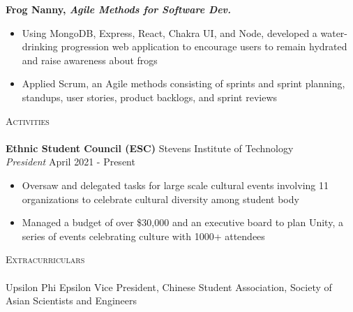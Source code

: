\documentclass[10pt]{article}
\newcommand{\lineunder} {
    \vspace*{-8pt} \\
    \hspace*{-18pt} \hrulefill \\
}
\newcommand{\header} [1] {
    {\hspace*{-18pt}\vspace*{6pt} \textsc{#1}}
    \vspace*{-6pt} \lineunder
}
\begin{document}
\textbf{Frog Nanny, \textit{Agile Methods for Software Dev.}} 
\begin{itemize}[noitemsep, topsep=0.5pt, parsep=0pt,partopsep=0pt]
    \item Using MongoDB, Express, React, Chakra UI, and Node, developed a water-drinking progression web application to encourage users to remain hydrated and raise awareness about frogs
    \item Applied Scrum, an Agile methods consisting of sprints and sprint planning, standups, user stories, product backlogs, and sprint reviews
\end{itemize}
\vspace{2mm}
\header{Activities}
\textbf{Ethnic Student Council (ESC)} \hfill Stevens Institute of Technology\\
\textit{President} \hfill April 2021 - Present\\
\vspace{-1mm}
\begin{itemize}[noitemsep,parsep=0pt,partopsep=0pt]
    \item Oversaw and delegated tasks for large scale cultural events involving 11 organizations to celebrate cultural diversity among student body
    \item Managed a budget of over \$30,000 and an executive board to plan Unity, a series of events celebrating culture with 1000+ attendees 
\end{itemize}
\vspace{2mm}
\header{Extracurriculars}
Upsilon Phi Epsilon Vice President, Chinese Student Association, Society of Asian Scientists and Engineers
\end{document}
